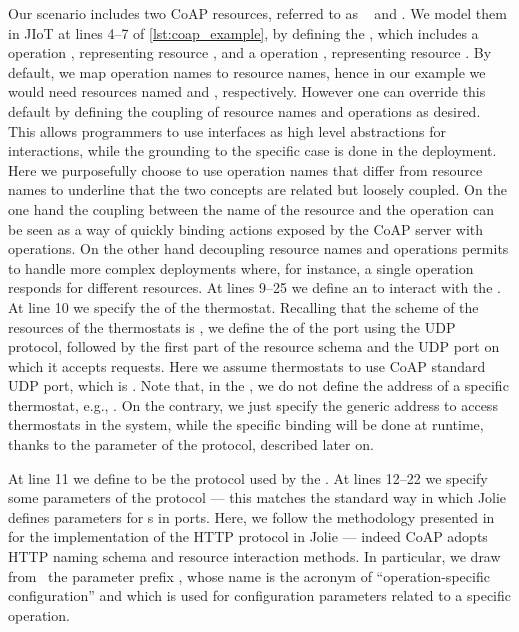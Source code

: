 Our scenario includes two CoAP resources, referred to as
~ and . 
We model them in JIoT at lines 4--7
of \cref{lst:coap_example}, by defining the 
, which includes a
 operation , representing resource
, and a  operation
, representing resource .
%
By default, we map operation names to resource names, hence in our example we
would need resources named  and
, respectively. However one
can override 
this default by defining the coupling of resource names and operations
as desired. This allows programmers to use interfaces as high level
abstractions for interactions, 
while the grounding to the specific case is done in the deployment.
% 
Here we purposefully choose to use operation names that differ from resource
names to underline that the two concepts are related but loosely coupled.
%
On the one hand the coupling between the name of the resource and the operation can be seen 
as a way of quickly binding actions exposed by the CoAP server with operations.
On the other hand decoupling resource names and operations permits to handle
more complex deployments where, for instance, a single operation responds for
different resources.
%
At lines 9--25 we define an  to interact with the
.
%
At line 10 we specify the  of the thermostat. Recalling that
the scheme of the resources of the thermostats is
, we define the  of
the port using the UDP  protocol, followed by the
first part of the resource schema  and the UDP port on
which it accepts requests. Here we assume thermostats to use CoAP standard UDP
port, which is . Note that, in the , we do
not define the address of a specific thermostat, e.g.,
. On the contrary, we just specify
the generic address to access thermostats in the system, while the specific
binding will be done at runtime, thanks to the  parameter of
the  protocol, described later on.

At line 11 we define  to be the protocol used by the 
. At lines 12--22 we specify some parameters of the
 protocol --- this matches the standard way in which Jolie defines
parameters for s in ports.
Here, we follow the methodology presented in~\cite{montesi16} for the
implementation of the HTTP protocol in Jolie --- indeed CoAP adopts HTTP naming
schema and resource interaction methods. In particular, we draw
from~\cite{montesi16} the parameter prefix , whose name is the
acronym of ``operation-specific configuration'' and which is used for
configuration parameters related to a specific operation.

